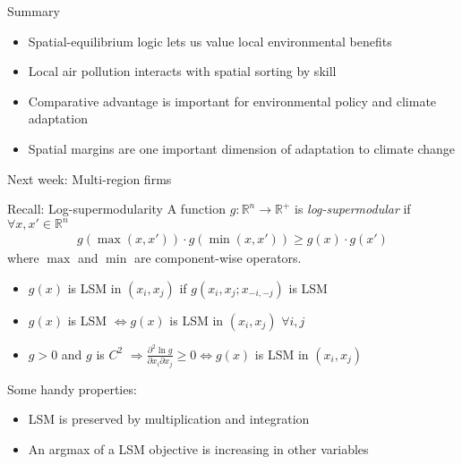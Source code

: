 \documentclass[11pt,notes=hide,aspectratio=169]{beamer}
\begin{document}
\begin{frame}{Summary}
\begin{itemize}
\item Spatial-equilibrium logic lets us value local environmental benefits
\item Local air pollution interacts with spatial sorting by skill
\item Comparative advantage is important for environmental policy and climate adaptation
\item Spatial margins are one important dimension of adaptation to climate change 
\end{itemize}
\vspace{1cm}
Next week: Multi-region firms
\end{frame}
\appendix
\begin{frame}{Recall: Log-supermodularity}
\hypertarget{appendix:LSM}{}
A function $g:\mathbb{R}^n\to\mathbb{R}^{+}$ is \emph{log-supermodular} if $\forall x,x'\in\mathbb{R}^n$
\begin{align*}
g\left(\max\left(x,x'\right)\right)\cdot g\left(\min\left(x,x'\right)\right)\geq g(x)\cdot g(x')
\end{align*}
where $\max$ and $\min$ are component-wise operators.
\begin{itemize}
	\item $g(x)$ is LSM in $(x_i,x_j)$ if $g(x_i,x_j;x_{-i,-j})$ is LSM 
	\item $g(x)$ is LSM $\iff g(x)$ is LSM in $(x_i,x_j)$  $\forall i,j$
	\item $g>0$ and $g$ is $C^2$ $\Rightarrow \frac{\partial^2 \ln g}{\partial x_i \partial x_j}\geq 0 \iff g(x)$ is LSM in $(x_i,x_j)$
\end{itemize}
Some handy properties:
\begin{itemize}
	\item LSM is preserved by multiplication and integration
	\item An argmax of a LSM objective is increasing in other variables
\end{itemize}
\hyperlink{institutionalsourcesofCA}{\beamerreturnbutton}
\end{frame}
\end{document}
